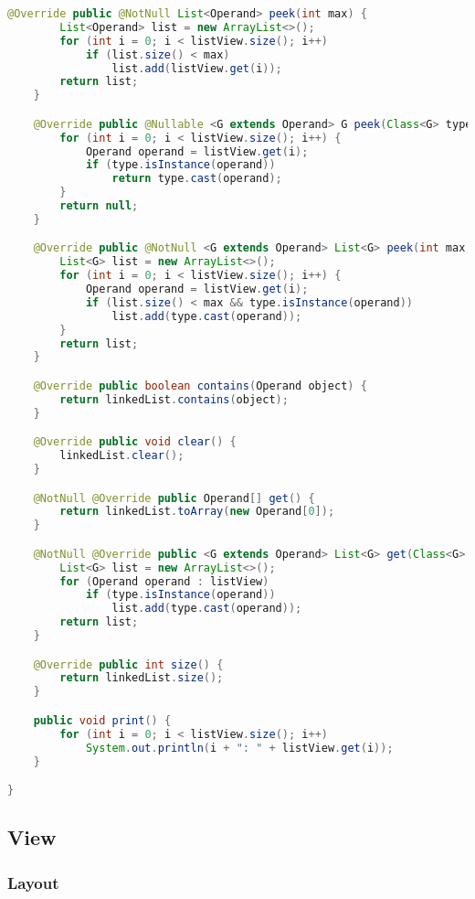 \begin{lstlisting}[caption=OperandStack (Keienburg),label=list:OperandStack,language=Java]
    @Override public @NotNull List<Operand> peek(int max) {
        List<Operand> list = new ArrayList<>();
        for (int i = 0; i < listView.size(); i++)
            if (list.size() < max)
                list.add(listView.get(i));
        return list;
    }

    @Override public @Nullable <G extends Operand> G peek(Class<G> type) {
        for (int i = 0; i < listView.size(); i++) {
            Operand operand = listView.get(i);
            if (type.isInstance(operand))
                return type.cast(operand);
        }
        return null;
    }

    @Override public @NotNull <G extends Operand> List<G> peek(int max, Class<G> type) {
        List<G> list = new ArrayList<>();
        for (int i = 0; i < listView.size(); i++) {
            Operand operand = listView.get(i);
            if (list.size() < max && type.isInstance(operand))
                list.add(type.cast(operand));
        }
        return list;
    }

    @Override public boolean contains(Operand object) {
        return linkedList.contains(object);
    }

    @Override public void clear() {
        linkedList.clear();
    }

    @NotNull @Override public Operand[] get() {
        return linkedList.toArray(new Operand[0]);
    }

    @NotNull @Override public <G extends Operand> List<G> get(Class<G> type) {
        List<G> list = new ArrayList<>();
        for (Operand operand : listView)
            if (type.isInstance(operand))
                list.add(type.cast(operand));
        return list;
    }

    @Override public int size() {
        return linkedList.size();
    }

    public void print() {
        for (int i = 0; i < listView.size(); i++)
            System.out.println(i + ": " + listView.get(i));
    }

}
\end{lstlisting} 

\subsection{View}

\subsubsection{Layout}

